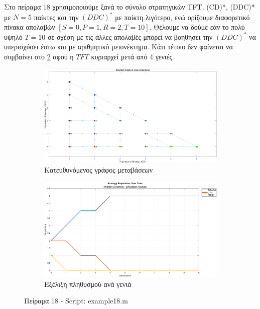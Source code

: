 \documentclass[12pt]{report}
\begin{document}
Στο πείραμα 18 χρησιμοποιούμε ξανά το σύνολο στρατηγικών \foreignlanguage{english}{TFT, (CD)*, (DDC)*} με $N=5$ παίκτες και την $(DDC)^*$ με παίκτη λιγότερο, ενώ ορίζουμε διαφορετικό πίνακα απολαβών $[S=0, P=1, R=2, T=10]$. Θέλουμε να δούμε εάν το πολύ υψηλό $T=10$ σε σχέση με τις άλλες απολαβές μπορεί να βοηθήσει την $(DDC)^*$ να υπερισχύσει έστω και με αριθμητικό μειονέκτημα. Κάτι τέτοιο δεν φαίνεται να συμβαίνει στο \ref{fig:fig18-sim} αφού η $TFT$ κυριαρχεί μετά από 4 γενιές.
\begin{figure}[H]
    \centering

    \begin{subfigure}[b]{0.45\textwidth}
        \includegraphics[width=\linewidth]{Figures Imitation Dynamics/example18.png}
        \caption{Κατευθυνόμενος γράφος μεταβάσεων}
        \label{fig:fig18}
    \end{subfigure}
    \hfill
    \begin{subfigure}[b]{0.45\textwidth}
        \includegraphics[width=\linewidth]{Figures Imitation Dynamics/example18-sim.png}
        \caption{Εξέλιξη πληθυσμού ανά γενιά}
        \label{fig:fig18-sim}
    \end{subfigure}

    \caption{Πείραμα 18 - \foreignlanguage{english}{Script: example18.m}}
    \label{fig:example18}
\end{figure}
\end{document}
